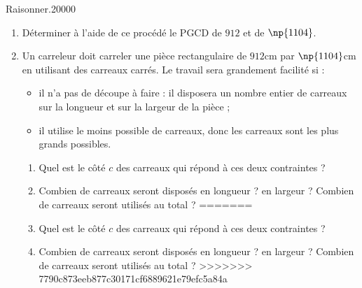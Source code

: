 \begin{pageAuto}
\begin{ExoAutoN}{Raisonner.}{2}{0}{0}{0}{0}
\begin{enumerate}[leftmargin=*]
\item Déterminer à l'aide de ce procédé le PGCD de $912$ et de $\np{1104}$. 
\item 
  Un carreleur doit carreler une pièce rectangulaire de $912$cm par
  $\np{1104}$cm
  en utilisant des carreaux carrés. Le travail sera grandement facilité
  si :
  \begin{itemize}
  \item il n'a pas de découpe à faire : il disposera un nombre entier
    de carreaux sur la longueur et sur la largeur de la pièce ;
  \item il utilise le moins possible de carreaux, donc les carreaux
    sont les plus grands possibles.
    
  \end{itemize}
  \begin{enumerate}
<<<<<<< HEAD
  \item Quel est le côté $c$ des carreaux qui répond à ces deux contraintes ?
  \item Combien de carreaux seront disposés en longueur ? en largeur ?
    Combien de carreaux seront utilisés au total ?
=======
  \item Quel est le côté $c$ des carreaux qui répond à ces deux contraintes ?
  \item Combien de carreaux seront disposés en longueur ? en largeur ?
    Combien de carreaux seront utilisés au total ?
>>>>>>> 7790c873eeb877c30171cf6889621e79efc5a84a
  \end{enumerate}
\end{enumerate}
\end{ExoAutoN}

\end{pageAuto}
